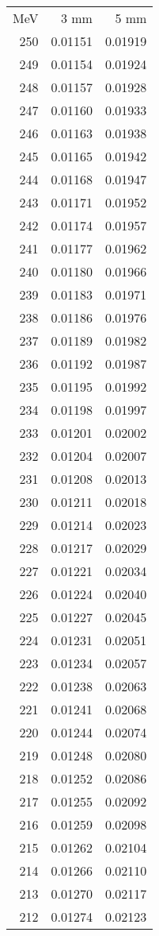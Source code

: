 \documentclass[11pt]{article}
\begin{document}
\begin{minipage}[l]{.3\linewidth}
\begin{tabular}{r|rr}
MeV&3 mm&5 mm\\
250&0.01151&0.01919\\ 
249&0.01154&0.01924\\ 
248&0.01157&0.01928\\ 
247&0.01160&0.01933\\ 
246&0.01163&0.01938\\ 
245&0.01165&0.01942\\ 
244&0.01168&0.01947\\ 
243&0.01171&0.01952\\ 
242&0.01174&0.01957\\ 
241&0.01177&0.01962\\ 
240&0.01180&0.01966\\ 
239&0.01183&0.01971\\ 
238&0.01186&0.01976\\ 
237&0.01189&0.01982\\ 
236&0.01192&0.01987\\ 
235&0.01195&0.01992\\ 
234&0.01198&0.01997\\ 
233&0.01201&0.02002\\ 
232&0.01204&0.02007\\ 
231&0.01208&0.02013\\ 
230&0.01211&0.02018\\ 
229&0.01214&0.02023\\ 
228&0.01217&0.02029\\ 
227&0.01221&0.02034\\ 
226&0.01224&0.02040\\ 
225&0.01227&0.02045\\ 
224&0.01231&0.02051\\ 
223&0.01234&0.02057\\ 
222&0.01238&0.02063\\ 
221&0.01241&0.02068\\ 
220&0.01244&0.02074\\ 
219&0.01248&0.02080\\ 
218&0.01252&0.02086\\ 
217&0.01255&0.02092\\ 
216&0.01259&0.02098\\ 
215&0.01262&0.02104\\ 
214&0.01266&0.02110\\ 
213&0.01270&0.02117\\ 
212&0.01274&0.02123\\ 

\end{tabular}
\end{minipage}
\end{document}
